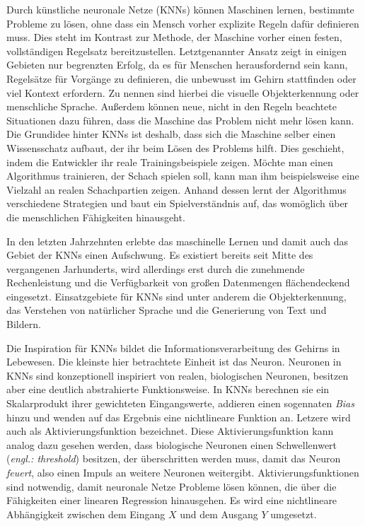 \label{chap:KNNs}
Durch künstliche neuronale Netze (\acsp{KNN}) können Maschinen lernen, bestimmte Probleme zu lösen, ohne dass ein Mensch vorher explizite Regeln dafür definieren muss. Dies steht im Kontrast zur Methode, der Maschine  vorher einen festen, vollständigen Regelsatz bereitzustellen. Letztgenannter Ansatz zeigt in einigen Gebieten nur begrenzten Erfolg, da es für Menschen herausfordernd sein kann, Regelsätze für Vorgänge zu definieren, die unbewusst im Gehirn stattfinden oder viel Kontext erfordern. Zu nennen sind hierbei die visuelle Objekterkennung oder menschliche Sprache. Außerdem können neue, nicht in den Regeln beachtete Situationen dazu führen, dass die Maschine das Problem nicht mehr lösen kann. Die Grundidee hinter \acp{KNN} ist deshalb, dass sich die Maschine selber einen Wissensschatz aufbaut, der ihr beim Lösen des Problems hilft. Dies geschieht, indem die Entwickler ihr reale Trainingsbeispiele zeigen. Möchte man einen Algorithmus trainieren, der Schach spielen soll, kann man ihm beispielsweise eine Vielzahl an realen Schachpartien zeigen. Anhand dessen lernt der Algorithmus verschiedene Strategien und baut ein Spielverständnis auf, das womöglich über die menschlichen Fähigkeiten hinausgeht. \cite[S. 1ff.]{DeepLearningBook}

In den letzten Jahrzehnten erlebte das maschinelle Lernen und damit auch das Gebiet der \acp{KNN} einen Aufschwung. Es existiert bereits seit Mitte des vergangenen Jarhunderts, wird allerdings erst durch die zunehmende Rechenleistung und die Verfügbarkeit von großen Datenmengen flächendeckend eingesetzt. Einsatzgebiete für \acp{KNN} sind unter anderem die Objekterkennung, das Verstehen von natürlicher Sprache und die Generierung von Text und Bildern. \cite[S. 4,17]{knnsKompakt}

Die Inspiration für \acp{KNN} bildet die Informationsverarbeitung des Gehirns in Lebewesen. Die kleinste hier betrachtete Einheit ist das Neuron. Neuronen in \acp{KNN} sind konzeptionell inspiriert von realen, biologischen Neuronen, besitzen aber eine deutlich abstrahierte Funktionsweise. In \acp{KNN} berechnen sie ein Skalarprodukt ihrer gewichteten Eingangswerte, addieren einen sogennaten \emph{Bias} hinzu und wenden auf das Ergebnis eine nichtlineare Funktion an. Letzere wird auch als Aktivierungsfunktion bezeichnet. Diese Aktivierungsfunktion kann analog dazu gesehen werden, dass biologische Neuronen einen Schwellenwert (\emph{engl.: threshold}) besitzen, der überschritten werden muss, damit das Neuron \emph{feuert}, also einen Impuls an weitere Neuronen weitergibt. Aktivierungsfunktionen sind notwendig, damit neuronale Netze Probleme lösen können, die über die Fähigkeiten einer linearen Regression hinausgehen. Es wird eine nichtlineare Abhängigkeit zwischen dem Eingang $X$ und dem Ausgang $Y$ umgesetzt. \cite{visualApproach}

